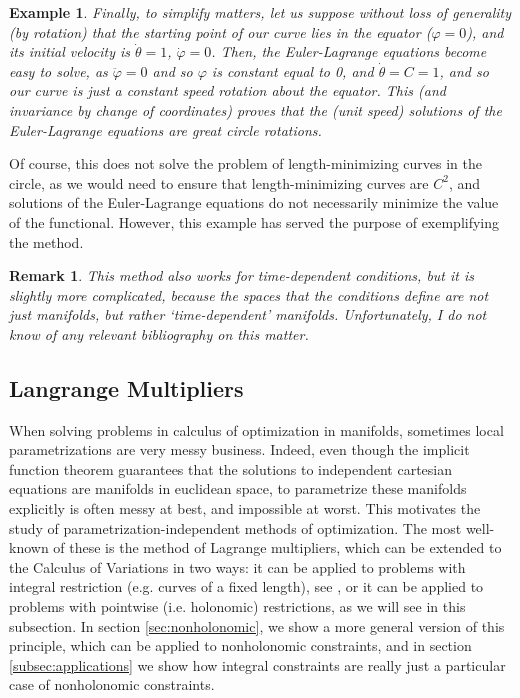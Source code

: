 \documentclass{article}
\theoremstyle{plain}
\newtheorem{remark}{Remark}
\newtheorem{example}{Example}
\theoremstyle{nonumberplain}
\begin{document}
\begin{example}
Finally, to simplify matters, let us suppose without loss of generality (by rotation) that the starting point of our curve lies in the equator ($\varphi = 0$), and its initial velocity is $\dot\theta = 1$, $\dot \varphi = 0$. Then, the Euler-Lagrange equations become easy to solve, as $\ddot \varphi = 0$ and so $\varphi$ is constant equal to 0, and $\dot \theta = C = 1$, and so our curve is just a constant speed rotation about the equator. This (and invariance by change of coordinates) proves that the (unit speed) solutions of the Euler-Lagrange equations are great circle rotations.
\end{example}

Of course, this does not solve the problem of length-minimizing curves in the circle, as we would need to ensure that length-minimizing curves are $C^2$, and solutions of the Euler-Lagrange equations do not necessarily minimize the value of the functional. However, this example has served the purpose of exemplifying the method.

\begin{remark}
This method also works for time-dependent conditions, but it is slightly more complicated, because the spaces that the conditions define are not just manifolds, but rather `time-dependent' manifolds. Unfortunately, I do not know of any relevant bibliography on this matter.
\end{remark}

\subsection{Langrange Multipliers}

When solving problems in calculus of optimization in manifolds, sometimes local parametrizations are very messy business. Indeed, even though the implicit function theorem guarantees that the solutions to independent cartesian equations are manifolds in euclidean space, to parametrize these manifolds explicitly is often messy at best, and impossible at worst. This motivates the study of parametrization-independent methods of optimization. The most well-known of these is the method of Lagrange multipliers, which can be extended to the Calculus of Variations in two ways: it can be applied to problems with integral restriction (e.g. curves of a fixed length), see \cite[\S 12.1]{gelfandfomin}, or it can be applied to problems with pointwise (i.e. holonomic) restrictions, as we will see in this subsection. In section \ref{sec:nonholonomic}, we show a more general version of this principle, which can be applied to nonholonomic constraints, and in section \ref{subsec:applications} we show how integral constraints are really just a particular case of nonholonomic constraints. %
\end{document}
